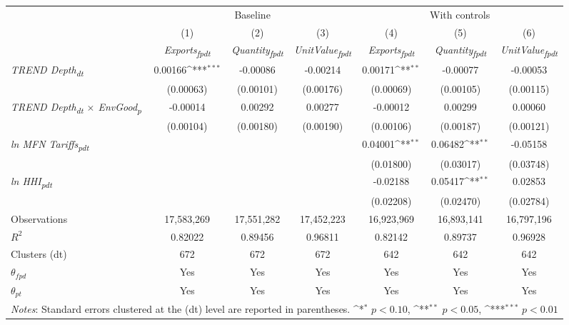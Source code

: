 {
\def\sym#1{\ifmmode^{#1}\else\(^{#1}\)\fi}
\begin{tabular}{l*{6}{c}}
\toprule
&\multicolumn{3}{c}{Baseline}&\multicolumn{3}{c}{With controls}\\\cmidrule(lr){2-4}\cmidrule(lr){5-7}
&(1)&(2)&(3)&(4)&(5)&(6)\\
&\textit{Exports\textsubscript{fpdt}}&\textit{Quantity\textsubscript{fpdt}}&\textit{UnitValue\textsubscript{fpdt}}&\textit{Exports\textsubscript{fpdt}}&\textit{Quantity\textsubscript{fpdt}}&\textit{UnitValue\textsubscript{fpdt}}\\
\midrule
\textit{TREND Depth\textsubscript{dt}} & 0.00166\sym{***} & -0.00086 & -0.00214 & 0.00171\sym{**} & -0.00077 & -0.00053\\
 & (0.00063) & (0.00101) & (0.00176) & (0.00069) & (0.00105) & (0.00115)\\
\addlinespace
\textit{TREND Depth\textsubscript{dt} $\times$ EnvGood\textsubscript{p}} & -0.00014 & 0.00292 & 0.00277 & -0.00012 & 0.00299 & 0.00060\\
 & (0.00104) & (0.00180) & (0.00190) & (0.00106) & (0.00187) & (0.00121)\\
\addlinespace
\textit{ln MFN Tariffs\textsubscript{pdt}} &  &  &  & 0.04001\sym{**} & 0.06482\sym{**} & -0.05158\\
 &  &  &  & (0.01800) & (0.03017) & (0.03748)\\
\addlinespace
\textit{ln HHI\textsubscript{pdt}} &  &  &  & -0.02188 & 0.05417\sym{**} & 0.02853\\
 &  &  &  & (0.02208) & (0.02470) & (0.02784)\\
\midrule
Observations & 17,583,269 & 17,551,282 & 17,452,223 & 16,923,969 & 16,893,141 & 16,797,196\\
$R^{2}$ & 0.82022 & 0.89456 & 0.96811 & 0.82142 & 0.89737 & 0.96928\\
Clusters (dt) & 672 & 672 & 672 & 642 & 642 & 642\\
$\theta_{fpd}$ & Yes & Yes & Yes & Yes & Yes & Yes\\
$\theta_{pt}$ & Yes & Yes & Yes & Yes & Yes & Yes\\
\bottomrule
\multicolumn{7}{l}{\footnotesize \textit{Notes}: Standard errors clustered at the (dt) level are reported in parentheses. \sym{*} \(p<0.10\), \sym{**} \(p<0.05\), \sym{***} \(p<0.01\)}\\
\end{tabular}
}

